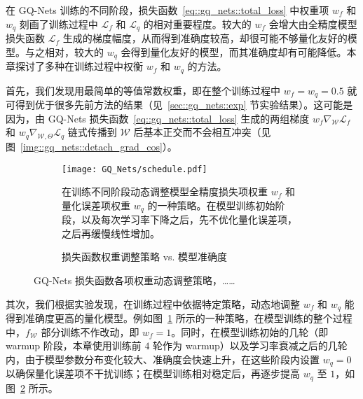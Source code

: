 在 GQ-Nets 训练的不同阶段，损失函数~\eqref{eq::gq_nets::total_loss} 中权重项 $w_f$ 和 $w_q$ 刻画了训练过程中 $\mathcal{L}_f$ 和 $\mathcal{L}_q$ 的相对重要程度。较大的 $w_f$ 会增大由全精度模型损失函数 $\mathcal{L}_f$ 生成的梯度幅度，从而得到准确度较高，却很可能不够量化友好的模型。与之相对，较大的 $w_q$ 会得到量化友好的模型，而其准确度却有可能降低。本章探讨了多种在训练过程中权衡 $w_f$ 和 $w_q$ 的方法。

首先，我们发现用最简单的等值常数权重，即在整个训练过程中 $w_f = w_q = 0.5$ 就可得到优于很多先前方法的结果（见~\ref{sec::gq_nets::exp} 节实验结果）。这可能是因为，由 GQ-Nets 损失函数~\eqref{eq::gq_nets::total_loss} 生成的两组梯度 $w_f \nabla_{\mathcal{W}}\mathcal{L}_f$ 和 $w_q \nabla_{\mathcal{W}, \Theta}\mathcal{L}_q$ 链式传播到 $\mathcal{W}$ 后基本正交而不会相互冲突（见图~\ref{img::gq_nets::detach_grad_cos}）。

\begin{figure}[htb]
  \centering
  \begin{subfigure}[b]{0.45\columnwidth}
    \centering
    \texttt{[image: GQ\_Nets/schedule.pdf]}
    \caption{在训练不同阶段动态调整模型全精度损失项权重 $w_f$ 和量化误差项权重 $w_q$ 的一种策略。在模型训练初始阶段，以及每次学习率下降之后，先不优化量化误差项，之后再缓慢线性增加。}
    \label{img::gq_nets::w_fq_schedule}
  \end{subfigure}
  \quad
  \begin{subfigure}[b]{0.45\columnwidth}
    \centering
    \caption{损失函数权重调整策略 vs. 模型准确度}
    \label{img::gq_nets::schedule_acc}
  \end{subfigure}
  \caption{GQ-Nets 损失函数各项权重动态调整策略，……}
  \label{img::gq_nets::schedule}
\end{figure}

其次，我们根据实验发现，在训练过程中依据特定策略，动态地调整 $w_f$ 和 $w_q$ 能得到准确度更高的量化模型。例如图~\ref{img::gq_nets::w_fq_schedule} 所示的一种策略，在模型训练的整个过程中，$f_{\mathcal{W}}$ 部分训练不作改动，即 $w_f = 1$。同时，在模型训练初始的几轮（即 warmup 阶段，本章使用训练前 $4$ 轮作为 warmup）以及学习率衰减之后的几轮内，由于模型参数分布变化较大、准确度会快速上升，在这些阶段内设置 $w_q = 0$ 以确保量化误差项不干扰训练；在模型训练相对稳定后，再逐步提高 $w_q$ 至 $1$，如图~\ref{img::gq_nets::schedule_acc} 所示。
